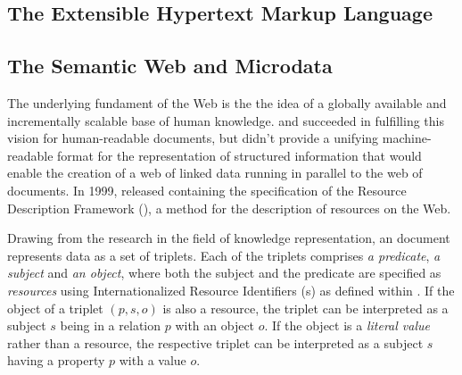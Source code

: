 \documentclass{book}
\begin{document}

      \subsection{The Extensible Hypertext Markup Language}

      \subsection{The Semantic Web and Microdata}
        The underlying fundament of the Web is the the idea of a globally
        available and incrementally scalable base of human knowledge.
         and  succeeded in fulfilling this vision
        for human-readable documents, but didn't provide a unifying
        machine-readable format for the representation of structured information
        that would enable the creation of a web of linked data running in
        parallel to the web of documents. In 1999,  released
        \cite{lassira99} containing the specification of the Resource
        Description Framework (), a method for the description of
        resources on the Web.

        Drawing from the research in the field of knowledge representation, an
         document represents data as a set of triplets. Each of the
        triplets comprises \emph{a predicate}, \emph{a subject} and \emph{an
        object}, where both the subject and the predicate are specified as
        \emph{resources} using Internationalized Resource Identifiers
        (s) as defined within \cite{rfc3987}. If the object of a
        triplet $(p,s,o)$ is also a resource, the triplet can be interpreted as
        a subject $s$ being in a relation $p$ with an object $o$. If the object
        is a \emph{literal value} rather than a resource, the respective triplet
        can be interpreted as a subject $s$ having a property $p$ with a value
        $o$.
\end{document}
